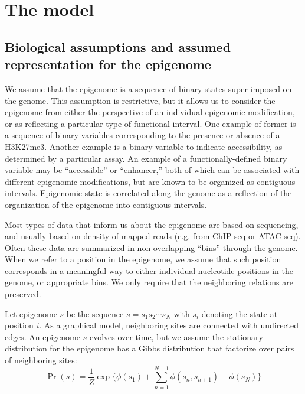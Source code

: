 \documentclass[11pt]{article}
\begin{document}
\section{The model}

\subsection{Biological assumptions and assumed representation for the epigenome}
\label{biodefs}

We assume that the epigenome is a sequence of binary states
super-imposed on the genome. This assumption is restrictive, but it
allows us to consider the epigenome from either the perspective of an
individual epigenomic modification, or as reflecting a particular type
of functional interval. One example of former is a sequence of binary
variables corresponding to the presence or absence of a H3K27me3.
Another example is a binary variable to indicate accessibility, as
determined by a particular assay. An example of a functionally-defined
binary variable may be ``accessible'' or ``enhancer,'' both of which
can be associated with different epigenomic modifications, but are
known to be organized as contiguous intervals. Epigenomic state is
correlated along the genome as a reflection of the organization of the
epigenome into contiguous intervals.

Most types of data that inform us about the epigenome are based on
sequencing, and usually based on density of mapped reads (e.g. from
ChIP-seq or ATAC-seq). Often these data are summarized in
non-overlapping ``bins'' through the genome. When we refer to a
position in the epigenome, we assume that such position corresponds in
a meaningful way to either individual nucleotide positions
in the genome, or appropriate bins. We only require that the
neighboring relations are preserved.

Let epigenome $s$ be the sequence $s=s_1s_2\cdots s_N$ with $s_i$
denoting the state at position $i$.
As a graphical model, neighboring sites are connected with undirected
edges. An epigenome $s$ evolves over time, but we assume the
stationary distribution for the epigenome has a Gibbs distribution
that factorize over pairs of neighboring sites:
\begin{equation}\label{eqn:stationary}
\Pr(s) = \frac{1}{Z} \exp\big\{\phi(s_1) +\sum_{n=1}^{N-1}\phi(s_n, s_{n+1}) + \phi(s_N)\big\}
\end{equation}
\end{document}
